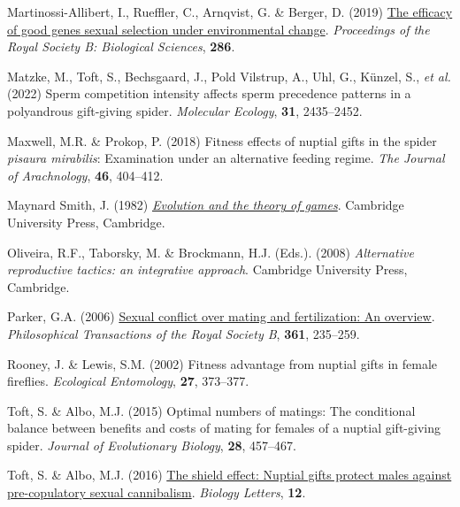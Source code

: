 \documentclass[
]{article}
\newlength{\cslhangindent}
\newlength{\cslentryspacingunit} %
\newenvironment{CSLReferences}[2] %
 {%
  \setlength{\parindent}{0pt}
  \ifodd #1
  \let\oldpar\par
  \def\par{\hangindent=\cslhangindent\oldpar}
  \fi
  \setlength{\parskip}{#2\cslentryspacingunit}
 }%
 {}
\begin{document}
\begin{CSLReferences}{0}{0}
\leavevmode{}%
Martinossi-Allibert, I., Rueffler, C., Arnqvist, G. \& Berger, D. (2019)
\href{https://doi.org/10.1098/rspb.2018.2313}{The efficacy of good genes
sexual selection under environmental change}. \emph{Proceedings of the
Royal Society B: Biological Sciences}, \textbf{286}.

\leavevmode{}%
Matzke, M., Toft, S., Bechsgaard, J., Pold Vilstrup, A., Uhl, G.,
Künzel, S., \emph{et al.} (2022) Sperm competition intensity affects
sperm precedence patterns in a polyandrous gift-giving spider.
\emph{Molecular Ecology}, \textbf{31}, 2435--2452.

\leavevmode{}%
Maxwell, M.R. \& Prokop, P. (2018) Fitness effects of nuptial gifts in
the spider \emph{pisaura mirabilis}: Examination under an alternative
feeding regime. \emph{The Journal of Arachnology}, \textbf{46},
404--412.

\leavevmode{}%
Maynard Smith, J. (1982)
\emph{\href{https://www.ncbi.nlm.nih.gov/pubmed/13761767}{{Evolution and
the theory of games}}}. Cambridge University Press, Cambridge.

\leavevmode{}%
Oliveira, R.F., Taborsky, M. \& Brockmann, H.J. (Eds.). (2008)
\emph{{Alternative reproductive tactics: an integrative approach}}.
Cambridge University Press, Cambridge.

\leavevmode{}%
Parker, G.A. (2006) \href{https://doi.org/10.1098/rstb.2005.1785}{Sexual
conflict over mating and fertilization: An overview}.
\emph{Philosophical Transactions of the Royal Society B}, \textbf{361},
235--259.

\leavevmode{}%
Rooney, J. \& Lewis, S.M. (2002) Fitness advantage from nuptial gifts in
female fireflies. \emph{Ecological Entomology}, \textbf{27}, 373--377.

\leavevmode{}%
Toft, S. \& Albo, M.J. (2015) Optimal numbers of matings: The
conditional balance between benefits and costs of mating for females of
a nuptial gift-giving spider. \emph{Journal of Evolutionary Biology},
\textbf{28}, 457--467.

\leavevmode{}%
Toft, S. \& Albo, M.J. (2016)
\href{https://doi.org/10.1098/rsbl.2015.1082}{{The shield effect:
Nuptial gifts protect males against pre-copulatory sexual cannibalism}}.
\emph{Biology Letters}, \textbf{12}.


\end{CSLReferences}
\end{document}
